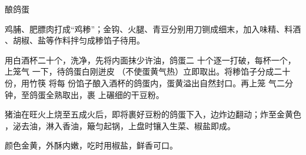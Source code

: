 \begin{recipe}{酿鸽蛋}

\ingredients


\preparation

\step 鸡脯、肥膘肉打成“鸡糁”；金钩、火腿、青豆分别用刀铡成细末，加入味精、料酒
、胡椒、盐等作料拌匀成糁馅子待用。

用白酒杯二十个，洗净，先将内面抹少许油，鸽蛋二 十个逐一打破，每杯一个，上笼气
一下，待鸽蛋白刚迸皮 （不使蛋黄气热）立即取出。将糁馅子分成二十份，用竹筷 将每
份馅子酿入酒杯的鸽蛋内，蛋黄溢出自然封口。再上笼 气二分钟，至鸽蛋全熟取出，裹
上碾细的干豆粉。

\step 猪油在旺火上烧至五成火后，即将裹好豆粉的鸽蛋下入，边炸边翻动；炸至金黄色
，泌去油，淋入香油，簸匀起锅，上盘时镶入生菜、椒盐即成。

\features

颜色金黄，外酥内嫩，吃时用椒盐，鲜香可口。

\end{recipe}


